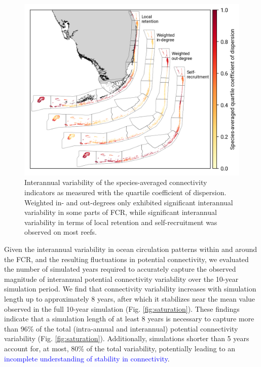 \documentclass[preprint,12pt,authoryear]{elsarticle}
\newcommand{\modif}[1]{\textcolor{blue}{#1}}
\begin{document}
	\begin{figure}
		\centering
		\includegraphics[width=\textwidth]{figures/species_averaged_quartile_coefficient_of_dispersion.png}
		\caption{Interannual variability of the species-averaged connectivity indicators as measured with the quartile coefficient of dispersion. Weighted in- and out-degrees only exhibited significant interannual variability in some parts of FCR, while significant interannual variability in terms of local retention and self-recruitment was observed on most reefs.
		}\label{fig:variability}
		
	\end{figure}
	
	Given the interannual variability in ocean circulation patterns within and around the FCR, and the resulting fluctuations in potential connectivity, we evaluated the number of simulated years required to accurately capture the observed magnitude of interannual potential connectivity variability over the 10-year simulation period. We find that connectivity variability increases with simulation length up to approximately 8 years, after which it stabilizes near the mean value observed in the full 10-year simulation (Fig. \ref{fig:saturation}). These findings indicate that a simulation length of at least 8 years is necessary to capture more than 96\% of the total (intra-annual and interannual) potential connectivity variability (Fig. \ref{fig:saturation}). Additionally, simulations shorter than 5 years account for, at most, 80\% of the total variability, potentially leading to an \modif{incomplete understanding of stability in connectivity}.
	
\end{document}
